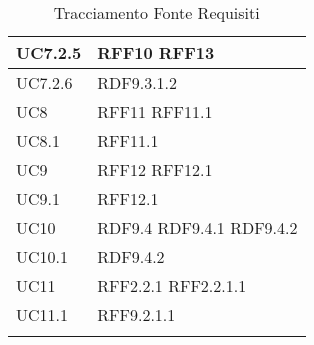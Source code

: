 \documentclass[../AnalisideiRequisiti.tex]{subfiles}
\begin{document}
\begin{longtable}{| p{4cm} | p{4cm} |}
		\hline
		\newline UC7.2.5 &  \newline RFF10 \newline RFF13 \\[1em]
		\hline
		\newline UC7.2.6 &  \newline RDF9.3.1.2 \\[1em]
		\hline
		\newline UC8 &  \newline RFF11 \newline RFF11.1 \\[1em]
		\hline
		
		\newline UC8.1 &  \newline RFF11.1 \\[1em]
		\hline
		
		\newline UC9 &  \newline RFF12 \newline RFF12.1 \\[1em]
		\hline
		\newline UC9.1 &  \newline RFF12.1 \\[1em]
		\hline
		\newline UC10 &  \newline RDF9.4 \newline RDF9.4.1 \newline RDF9.4.2 \\[1em]
		\hline
		\newline UC10.1 &  \newline RDF9.4.2 \\[1em]
		\hline
		\newline UC11 &  \newline RFF2.2.1 \newline RFF2.2.1.1\\[1em]
		\hline
		\newline UC11.1 &  \newline RFF9.2.1.1 \\[1em]
		\hline
		
		\caption{Tracciamento Fonte Requisiti}
	\end{longtable}
\newpage
\end{document}
